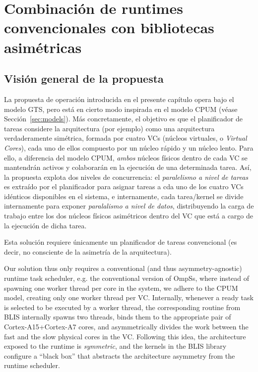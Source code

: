 \section{Combinación de runtimes convencionales con bibliotecas asimétricas}

\subsection{Visión general de la propuesta}

La propuesta de operación introducida en el presente capítulo opera bajo el modelo GTS, pero está en cierto modo 
inspirada en el modelo CPUM (véase Sección~\ref{sec:models}). Más concretamente, el objetivo es que el planificador
de tareas considere la arquitectura \odroid (por ejemplo) como una arquitectura verdaderamente simétrica, formada por 
cuatro VCs (núcleos virtuales, o {\em Virtual Cores}), cada uno de ellos compuesto por un núcleo rápido y un núcleo
lento. Para ello, a diferencia del modelo CPUM, {\em ambos} núcleos físicos dentro de cada VC se mantendrán activos y 
colaborarán en la ejecución de una determinada tarea. Así, la propuesta explota dos niveles de concurrencia: el {\em paralelismo
a nivel de tareas} es extraído por el planificador para asignar tareas a cda uno de los cuatro VCs idénticos disponibles en
el sistema, e internamente, cada tarea/kernel se divide internamente para exponer {\em paralalismo a nivel de datos}, 
distribuyendo la carga de trabajo entre los dos núcleos físicos asimétricos dentro del VC que está a cargo de la ejecución
de dicha tarea.

Esta solución requiere únicamente un planificador de tareas convencional (es decir, no consciente de la asimetría de la arquitectura).

Our solution thus only requires a conventional 
(and thus asymmetry-agnostic) runtime task scheduler, e.g. the conventional version of OmpSs, where instead of spawning one worker thread
per core in the system, we adhere to the CPUM model, creating only one worker thread per VC.
Internally, whenever a ready task is selected to be executed by a worker thread, 
the corresponding routine from BLIS internally spawns two threads, 
binds them to the appropriate pair of Cortex-A15+Cortex-A7 cores, 
and asymmetrically divides the work between the fast and the slow physical cores in the VC.
Following this idea, the architecture exposed to the runtime is {\em symmetric}, 
and the kernels in the BLIS library configure a ``black box'' that abstracts the 
architecture asymmetry from the runtime scheduler. 

